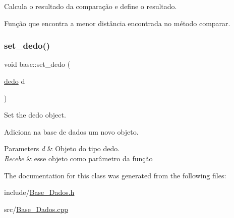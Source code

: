 Calcula o resultado da comparação e define o resultado. 

Função que encontra a menor distância encontrada no método comparar.\mbox{\label{classbase_aff56c74591768308bb3cfbcde7901926}} 
\subsubsection{\texorpdfstring{set\+\_\+dedo()}{set\_dedo()}}
{\footnotesize\ttfamily void base\+::set\+\_\+dedo (\begin{DoxyParamCaption}\item[{\mbox{\hyperlink{classdedo}{dedo}}}]{d }\end{DoxyParamCaption})}



Set the dedo object. 

Adiciona na base de dados um novo objeto.


\begin{DoxyParams}{Parameters}
{\em d} & Objeto do tipo dedo.\\
\hline
{\em Recebe} & esse objeto como parâmetro da função \\
\hline
\end{DoxyParams}


The documentation for this class was generated from the following files\+:\begin{DoxyCompactItemize}
\item 
include/\mbox{\hyperlink{_base___dados_8h}{Base\+\_\+\+Dados.\+h}}\item 
src/\mbox{\hyperlink{_base___dados_8cpp}{Base\+\_\+\+Dados.\+cpp}}\end{DoxyCompactItemize}
